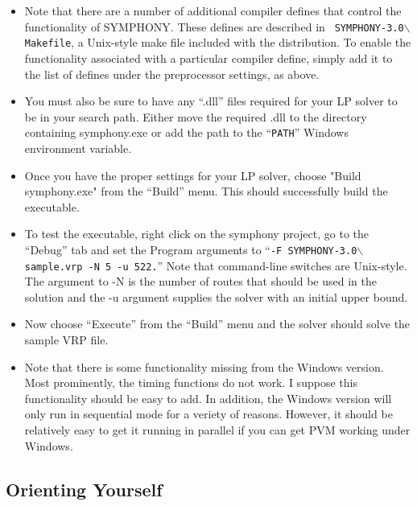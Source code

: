 \begin{itemize}
\begin{itemize}
\end{itemize}

\item Note that there are a number of additional compiler defines that control
the functionality of SYMPHONY. These defines are described in {\tt
SYMPHONY-3.0$\backslash$Makefile}, a Unix-style make file included with the
distribution. To enable the functionality associated with a particular
compiler define, simply add it to the list of defines under the preprocessor
settings, as above.

\item You must also be sure to have any ``.dll'' files required for your LP 
solver to be in your search path. Either move the required .dll to the
directory containing symphony.exe or add the path to the ``{\tt PATH}''
Windows environment variable.

\item Once you have the proper settings for your LP solver, choose "Build
symphony.exe" from the ``Build'' menu. This should successfully build the
executable.

\item To test the executable, right click on the symphony project, go to the
``Debug'' tab and set the Program arguments to ``{\tt -F
SYMPHONY-3.0$\backslash$sample.vrp -N 5 -u 522.}'' Note that command-line
switches are Unix-style. The argument to -N is the number of routes that
should be used in the solution and the -u argument supplies the solver with an
initial upper bound.

\item Now choose ``Execute'' from the ``Build'' menu and the solver should 
solve the sample VRP file.

\item Note that there is some functionality missing from the Windows
version. Most prominently, the timing functions do not work. I suppose this
functionality should be easy to add. In addition, the Windows
version will only run in sequential mode for a veriety of reasons. However, it
should be relatively easy to get it running in parallel if you can get PVM
working under Windows.

\end{itemize}

\subsection{Orienting Yourself}

